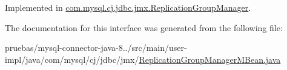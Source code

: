 Implemented in \mbox{\hyperlink{classcom_1_1mysql_1_1cj_1_1jdbc_1_1jmx_1_1_replication_group_manager_a56956d19b252d2f12b5e345a8df2be4b}{com.\+mysql.\+cj.\+jdbc.\+jmx.\+Replication\+Group\+Manager}}.



The documentation for this interface was generated from the following file\+:\begin{DoxyCompactItemize}
\item 
pruebas/mysql-\/connector-\/java-\/8../src/main/user-\/impl/java/com/mysql/cj/jdbc/jmx/\mbox{\hyperlink{_replication_group_manager_m_bean_8java}{Replication\+Group\+Manager\+M\+Bean.\+java}}\end{DoxyCompactItemize}

